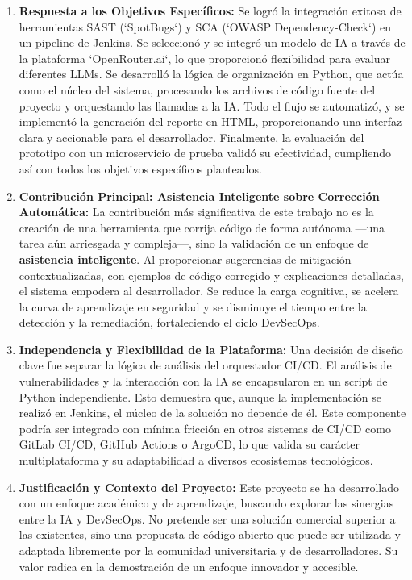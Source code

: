 \begin{enumerate}
    \item \textbf{Respuesta a los Objetivos Específicos:} Se logró la integración exitosa de herramientas SAST (`SpotBugs`) y SCA (`OWASP Dependency-Check`) en un pipeline de Jenkins. Se seleccionó y se integró un modelo de IA a través de la plataforma `OpenRouter.ai`, lo que proporcionó flexibilidad para evaluar diferentes LLMs. Se desarrolló la lógica de organización en Python, que actúa como el núcleo del sistema, procesando los archivos de código fuente del proyecto y orquestando las llamadas a la IA. Todo el flujo se automatizó, y se implementó la generación del reporte en HTML, proporcionando una interfaz clara y accionable para el desarrollador. Finalmente, la evaluación del prototipo con un microservicio de prueba validó su efectividad, cumpliendo así con todos los objetivos específicos planteados.

    \item \textbf{Contribución Principal: Asistencia Inteligente sobre Corrección Automática:} La contribución más significativa de este trabajo no es la creación de una herramienta que corrija código de forma autónoma ---una tarea aún arriesgada y compleja---, sino la validación de un enfoque de \textbf{asistencia inteligente}. Al proporcionar sugerencias de mitigación contextualizadas, con ejemplos de código corregido y explicaciones detalladas, el sistema empodera al desarrollador. Se reduce la carga cognitiva, se acelera la curva de aprendizaje en seguridad y se disminuye el tiempo entre la detección y la remediación, fortaleciendo el ciclo DevSecOps.

    \item \textbf{Independencia y Flexibilidad de la Plataforma:} Una decisión de diseño clave fue separar la lógica de análisis del orquestador CI/CD. El análisis de vulnerabilidades y la interacción con la IA se encapsularon en un script de Python independiente. Esto demuestra que, aunque la implementación se realizó en Jenkins, el núcleo de la solución no depende de él. Este componente podría ser integrado con mínima fricción en otros sistemas de CI/CD como GitLab CI/CD, GitHub Actions o ArgoCD, lo que valida su carácter multiplataforma y su adaptabilidad a diversos ecosistemas tecnológicos.

    \item \textbf{Justificación y Contexto del Proyecto:} Este proyecto se ha desarrollado con un enfoque académico y de aprendizaje, buscando explorar las sinergias entre la IA y DevSecOps. No pretende ser una solución comercial superior a las existentes, sino una propuesta de código abierto que puede ser utilizada y adaptada libremente por la comunidad universitaria y de desarrolladores. Su valor radica en la demostración de un enfoque innovador y accesible.
\end{enumerate}

